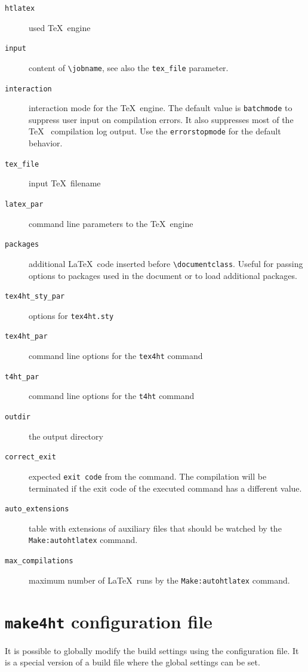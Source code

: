 \begin{description}
\item[\texttt{htlatex}]
used \TeX~engine
\item[\texttt{input}]
content of \texttt{\textbackslash{}jobname}, see also the
\texttt{tex\_file} parameter.
\item[\texttt{interaction}]
interaction mode for the \TeX~engine. The default value is
\texttt{batchmode} to suppress user input on compilation errors. It also
suppresses most of the \TeX~ compilation log output. Use the
\texttt{errorstopmode} for the default behavior.
\item[\texttt{tex\_file}]
input \TeX~filename
\item[\texttt{latex\_par}]
command line parameters to the \TeX~engine
\item[\texttt{packages}]
additional \LaTeX~code inserted before
\texttt{\textbackslash{}documentclass}. Useful for passing options to
packages used in the document or to load additional packages.
\item[\texttt{tex4ht\_sty\_par}]
options for \texttt{tex4ht.sty}
\item[\texttt{tex4ht\_par}]
command line options for the \texttt{tex4ht} command
\item[\texttt{t4ht\_par}]
command line options for the \texttt{t4ht} command
\item[\texttt{outdir}]
the output directory
\item[\texttt{correct\_exit}]
expected \texttt{exit\ code} from the command. The compilation will be
terminated if the exit code of the executed command has a different
value.
\item[\texttt{auto\_extensions}]
table with extensions of auxiliary files that should be watched by the
\texttt{Make:autohtlatex} command.
\item[\texttt{max\_compilations}]
maximum number of \LaTeX~runs by the \texttt{Make:autohtlatex} command.
\end{description}

\section{\texorpdfstring{\texttt{make4ht} configuration
file}{make4ht configuration file}}\label{configfile}

It is possible to globally modify the build settings using the
configuration file. It is a special version of a build file where the
global settings can be set.

